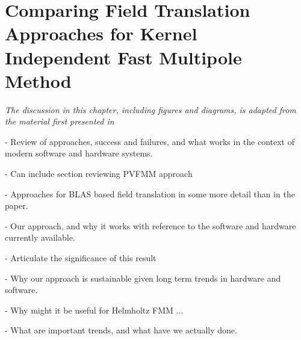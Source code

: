 \chapter{Comparing Field Translation Approaches for Kernel Independent Fast Multipole Method}\label{chpt:field_translation}
\thispagestyle{chaptertitle} %


\begin{center}
    \textit{The discussion in this chapter, including figures and diagrams, is adapted from the material first presented in \cite{kailasa2024m2ltranslationoperatorskernel} }
\end{center}


- Review of approaches, success and failures, and what works in the context of modern software and hardware systems.

- Can include section reviewing PVFMM approach

- Approaches for BLAS based field translation in some more detail than in the paper.

- Our approach, and why it works with reference to the software and hardware currently available.

- Articulate the significance of this result

- Why our approach is sustainable given long term trends in hardware and software.

- Why might it be useful for Helmholtz FMM ...

- What are important trends, and what have we actually done.